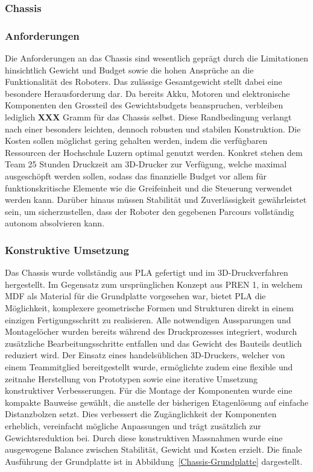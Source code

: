 \documentclass[main.tex]{subfiles} %
\begin{document}

\subsubsection{Chassis}

\subsubsection*{Anforderungen}

Die Anforderungen an das Chassis sind wesentlich geprägt durch die Limitationen 
hinsichtlich Gewicht und Budget sowie die hohen Ansprüche an die Funktionalität 
des Roboters. Das zulässige Gesamtgewicht stellt dabei eine besondere 
Herausforderung dar. Da bereits Akku, Motoren und elektronische Komponenten 
den Grossteil des Gewichtsbudgets beanspruchen, verbleiben lediglich \textbf{XXX} 
Gramm für das Chassis selbst. Diese Randbedingung verlangt nach einer besonders 
leichten, dennoch robusten und stabilen Konstruktion. Die Kosten sollen möglichst 
gering gehalten werden, indem die verfügbaren Ressourcen der Hochschule Luzern 
optimal genutzt werden. Konkret stehen dem Team 25 Stunden Druckzeit am 3D-Drucker 
zur Verfügung, welche maximal ausgeschöpft werden sollen, sodass das finanzielle 
Budget vor allem für funktionskritische Elemente wie die Greifeinheit 
und die Steuerung verwendet werden kann. Darüber hinaus müssen Stabilität und 
Zuverlässigkeit gewährleistet sein, um sicherzustellen, dass der Roboter den 
gegebenen Parcours vollständig autonom absolvieren kann.


\subsubsection*{Konstruktive Umsetzung}

Das Chassis wurde vollständig aus PLA gefertigt und im 3D-Druckverfahren 
hergestellt. Im Gegensatz zum ursprünglichen Konzept aus PREN 1, in welchem 
MDF als Material für die Grundplatte vorgesehen war, bietet PLA die 
Möglichkeit, komplexere geometrische Formen und Strukturen direkt in einem 
einzigen Fertigungsschritt zu realisieren. Alle notwendigen Aussparungen 
und Montagelöcher wurden bereits während des Druckprozesses integriert, 
wodurch zusätzliche Bearbeitungsschritte entfallen und das Gewicht des 
Bauteils deutlich reduziert wird. Der Einsatz eines handelsüblichen 
3D-Druckers, welcher von einem Teammitglied bereitgestellt wurde, 
ermöglichte zudem eine flexible und zeitnahe Herstellung von Prototypen 
sowie eine iterative Umsetzung konstruktiver Verbesserungen. Für die Montage 
der Komponenten wurde eine kompakte Bauweise gewählt, die anstelle der 
bisherigen Etagenlösung auf einfache Distanzbolzen setzt. Dies verbessert die 
Zugänglichkeit der Komponenten erheblich, vereinfacht mögliche Anpassungen 
und trägt zusätzlich zur Gewichtsreduktion bei. Durch diese konstruktiven 
Massnahmen wurde eine ausgewogene Balance zwischen Stabilität, Gewicht und 
Kosten erzielt. Die finale Ausführung der Grundplatte ist in 
Abbildung~\ref{Chassis-Grundplatte} dargestellt.
\end{document}
